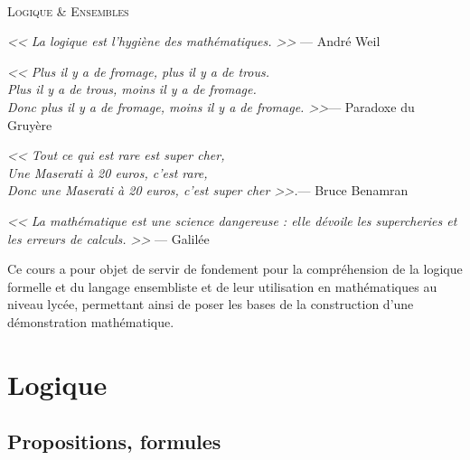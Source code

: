\documentclass[11pt]{article}
\theoremstyle{definition}
\theoremstyle{remark}
\begin{document}
\begin{center}
	\hrulefill\\
    \vspace{6mm}
	\textsc{\LARGE Logique \& Ensembles}\\
    \vspace{3mm}
    \hrulefill
\end{center}
\vspace{1cm}

\begin{flushright}
\textit{<< La logique est l'hygiène des mathématiques. >>} \hfill— André Weil\end{flushright}

\begin{flushleft}
\textit{<<
	Plus il y a de fromage, plus il y a de trous.\\
	Plus il y a de trous, moins il y a de fromage.\\
	Donc plus il y a de fromage, moins il y a de fromage.
	 >>}\hfill — Paradoxe du Gruyère
\end{flushleft}

\begin{flushleft}
\textit{<< Tout ce qui est rare est super cher,\\
    Une Maserati à 20 euros, c'est rare,\\
    Donc une Maserati à 20 euros, c'est super cher >>.}\hfill — Bruce Benamran
\end{flushleft}

\begin{flushleft}
\textit{<< La mathématique est une science dangereuse : elle dévoile les supercheries et les erreurs de calculs. >>} \hfill — Galilée
\end{flushleft}

\vspace{1em}
Ce cours a pour objet de servir de fondement pour la compréhension de la logique formelle et du langage ensembliste et de leur utilisation en mathématiques au niveau lycée, permettant ainsi de poser les bases de la construction d'une démonstration mathématique.


\section{Logique}

\subsection{Propositions, formules}
\end{document}
